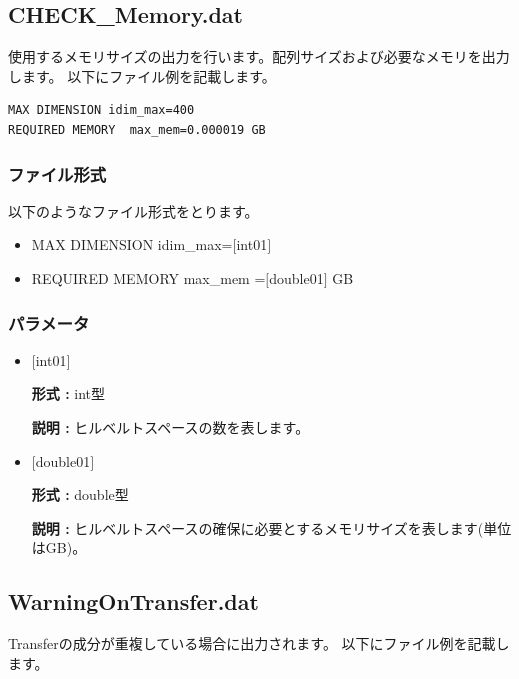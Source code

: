 \newpage
\subsection{CHECK\_Memory.dat}
使用するメモリサイズの出力を行います。配列サイズおよび必要なメモリを出力します。
以下にファイル例を記載します。

\begin{minipage}{12.5cm}
\begin{screen}
\begin{verbatim}
MAX DIMENSION idim_max=400 
REQUIRED MEMORY  max_mem=0.000019 GB 
\end{verbatim}
\end{screen}
\end{minipage}

\subsubsection{ファイル形式}
以下のようなファイル形式をとります。
 \begin{itemize}
   \item  MAX DIMENSION idim\_max=$[$int01$]$
   \item  REQUIRED MEMORY  max\_mem =$[$double01$]$ GB 
 \end{itemize}
 
\subsubsection{パラメータ}
 \begin{itemize}

    \item  $[$int01$]$ 
   
    {\bf 形式 :} int型

   {\bf 説明 :} ヒルベルトスペースの数を表します。
      
   \item  $[$double01$]$
   
    {\bf 形式 :} double型

    {\bf 説明 :}  ヒルベルトスペースの確保に必要とするメモリサイズを表します(単位はGB)。
 
\end{itemize}

\newpage
\subsection{WarningOnTransfer.dat}
Transferの成分が重複している場合に出力されます。
以下にファイル例を記載します。

